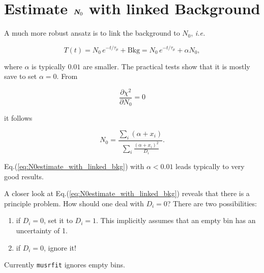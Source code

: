 \documentclass[twoside]{article}
\def\mathbi#1{\textbf{\em #1}}
\newcommand{\ie}{\emph{i.e.\xspace}}
\begin{document}
\section*{Estimate $\mathbi{N}_0$ with linked Background}

A much more robust ansatz is to link the background to $N_0$, \ie

\begin{equation}\label{eq:N0ansatz_with_linked_bkg}
 T(t) = N_0\, e^{-t/\tau_\mu} + \mathrm{Bkg} = N_0\, e^{-t/\tau_\mu} + \alpha
N_0,
\end{equation}

\noindent where $\alpha$ is typically $0.01$ are smaller. The practical tests
show that it is mostly save to set $\alpha=0$. From 

$$ \frac{\partial \chi^2}{\partial N_0} = 0 $$

\noindent it follows

\begin{equation}\label{eq:N0estimate_with_linked_bkg}
 N_0 = \frac{\displaystyle\sum_i (\alpha +
x_i)}{\displaystyle\sum_i\frac{(\alpha + x_i)^2}{D_i}}.
\end{equation}

\noindent Eq.(\ref{eq:N0estimate_with_linked_bkg}) with $\alpha < 0.01$ leads typically to
very good results.

A closer look at Eq.(\ref{eq:N0estimate_with_linked_bkg}) reveals that there is
a principle problem. How should one deal with $D_i = 0$? There are two
possibilities:

\begin{enumerate}
 \item if $D_i = 0$, set it to $D_i = 1$. This implicitly assumes that an empty bin has an uncertainty of 1.
 \item if $D_i = 0$, ignore it!
\end{enumerate}

\noindent Currently \texttt{musrfit} ignores empty bins.
\end{document}

